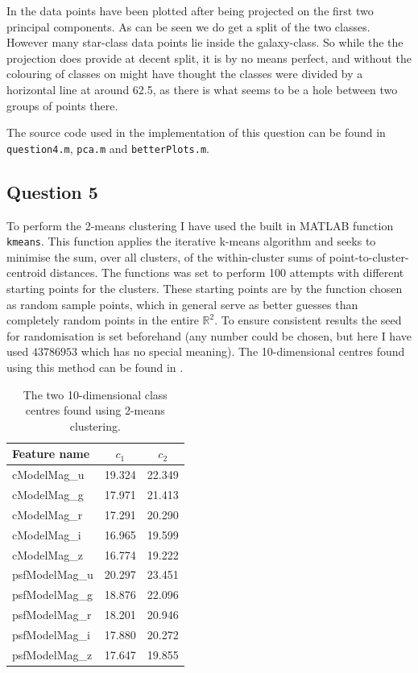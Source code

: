 \documentclass[a4paper, 11pt]{article}
\begin{document}
In  the data points have been plotted after being projected on the first two principal components. As can be seen we do get a split of the two classes. However many star-class data points lie inside the galaxy-class. So while the the projection does provide at decent split, it is by no means perfect, and without the colouring of classes on might have thought the classes were divided by a horizontal line at around 62.5, as there is what seems to be a hole between two groups of points there.

The source code used in the implementation of this question can be found in \texttt{question4.m}, \texttt{pca.m} and \texttt{betterPlots.m}.

\subsection*{Question 5}
To perform the 2-means clustering I have used the built in MATLAB function \texttt{kmeans}. This function applies the iterative k-means algorithm and seeks to minimise the sum, over all clusters, of the within-cluster sums of point-to-cluster-centroid distances. The functions was set to perform 100 attempts with different starting points for the clusters. These starting points are by the function chosen as random sample points, which in general serve as better guesses than completely random points in the entire $\mathbb{R}^2$. To ensure consistent results the seed for randomisation is set beforehand (any number could be chosen, but here I have used $43786953$ which has no special meaning). The 10-dimensional centres found using this method can be found in .

\begin{table}[H]
    \centering
    \begin{tabular}{lcc}
        \toprule
        Feature name & $c_1$ & $c_2$ \\
        \midrule
        cModelMag\_u & 19.324 & 22.349 \\
        cModelMag\_g & 17.971 & 21.413 \\
        cModelMag\_r & 17.291 & 20.290 \\
        cModelMag\_i & 16.965 & 19.599 \\
        cModelMag\_z & 16.774 & 19.222 \\
        psfModelMag\_u & 20.297 & 23.451 \\
        psfModelMag\_g & 18.876 & 22.096 \\
        psfModelMag\_r & 18.201 & 20.946 \\
        psfModelMag\_i & 17.880 & 20.272 \\
        psfModelMag\_z & 17.647 & 19.855 \bottomrule
    \end{tabular}
    \caption{The two 10-dimensional class centres found using 2-means clustering.}\label{tab:question4}
\end{table}
\end{document}
